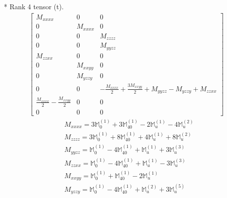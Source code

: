 \documentclass[fleqn,8pt,landscape]{jsarticle}
\begin{document}
* Rank 4 tensor (t).
\begin{align*}
\begin{bmatrix} M_{xxxx} & 0 & 0 \\ 0 & M_{xxxx} & 0 \\ 0 & 0 & M_{zzzz} \\ 0 & 0 & M_{yyzz} \\ M_{zzxx} & 0 & 0 \\ 0 & M_{xxyy} & 0 \\ 0 & M_{yzzy} & 0 \\ 0 & 0 & - \frac{M_{xxxx}}{2} + \frac{3 M_{xxyy}}{2} + M_{yyzz} - M_{yzzy} + M_{zzxx} \\ \frac{M_{xxxx}}{2} - \frac{M_{xxyy}}{2} & 0 & 0 \\ 0 & 0 & 0 \end{bmatrix}
\end{align*}
\begin{align*}
& M_{xxxx} = 3 \mathbb{M}_{0}^{(1)} + 3 \mathbb{M}_{40}^{(1)} - 2 \mathbb{M}_{u}^{(1)} - 4 \mathbb{M}_{u}^{(2)} \\
& M_{zzzz} = 3 \mathbb{M}_{0}^{(1)} + 8 \mathbb{M}_{40}^{(1)} + 4 \mathbb{M}_{u}^{(1)} + 8 \mathbb{M}_{u}^{(2)} \\
& M_{yyzz} = \mathbb{M}_{0}^{(1)} - 4 \mathbb{M}_{40}^{(1)} + \mathbb{M}_{u}^{(1)} + 3 \mathbb{M}_{u}^{(3)} \\
& M_{zzxx} = \mathbb{M}_{0}^{(1)} - 4 \mathbb{M}_{40}^{(1)} + \mathbb{M}_{u}^{(1)} - 3 \mathbb{M}_{u}^{(3)} \\
& M_{xxyy} = \mathbb{M}_{0}^{(1)} + \mathbb{M}_{40}^{(1)} - 2 \mathbb{M}_{u}^{(1)} \\
& M_{yzzy} = \mathbb{M}_{0}^{(1)} - 4 \mathbb{M}_{40}^{(1)} + \mathbb{M}_{u}^{(2)} + 3 \mathbb{M}_{u}^{(5)}
\end{align*}
\end{document}
